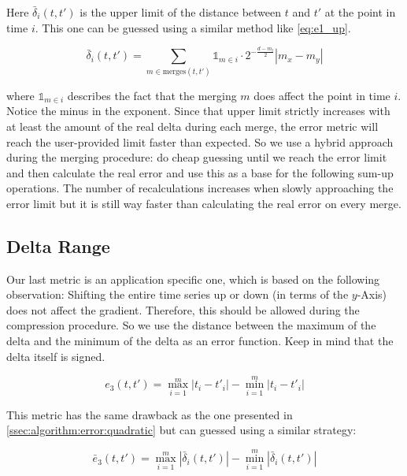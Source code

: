 Here $\bar{\delta}_i(t, t')$ is the upper limit of the distance between $t$ and $t'$ at the point in time $i$. This one can be guessed using a similar method like \autoref{eq:e1_up}.

\begin{equation}\label{eq:delta_up}
    \bar{\delta}_i\left(t, t'\right) = \sum_{m \in \mathrm{merges}(t, t')} \mathbb{1}_{m \in i} \cdot 2^{-\frac{d - m_l}{2}} \left|m_x - m_y\right|
\end{equation}

where $\mathbb{1}_{m \in i}$ describes the fact that the merging $m$ does affect the point in time $i$. Notice the minus in the exponent. Since that upper limit strictly increases with at least the amount of the real delta during each merge, the error metric will reach the user-provided limit faster than expected. So we use a hybrid approach during the merging procedure: do cheap guessing until we reach the error limit and then calculate the real error and use this as a base for the following sum-up operations. The number of recalculations increases when slowly approaching the error limit but it is still way faster than calculating the real error on every merge.


\subsection{Delta Range}
\label{ssec:algorithm:error:range}

Our last metric is an application specific one, which is based on the following observation: Shifting the entire time series up or down (in terms of the $y$-Axis) does not affect the gradient. Therefore, this should be allowed during the compression procedure. So we use the distance between the maximum of the delta and the minimum of the delta as an error function. Keep in mind that the delta itself is signed.

\begin{equation}\label{eq:e3}
    e_3\left(t, t'\right) = \max_{i=1}^m \left|t_i - t'_i\right| - \min_{i=1}^m \left|t_i - t'_i\right|
\end{equation}

This metric has the same drawback as the one presented in \autoref{ssec:algorithm:error:quadratic} but can guessed using a similar strategy:

\begin{equation}\label{eq:e3_up}
    \bar{e}_3\left(t, t'\right) = \max_{i=1}^m \left|\bar{\delta}_i(t, t')\right| - \min_{i=1}^m \left|\bar{\delta}_i(t, t')\right|
\end{equation}



